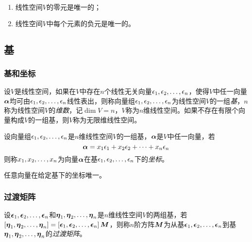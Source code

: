 \documentclass{ctexart}
\begin{document}
\begin{property}
    \begin{enumerate}
        \item 线性空间\(V\)的零元是唯一的；
        \item 线性空间\(V\)中每个元素的负元是唯一的。
    \end{enumerate}
\end{property}

\subsection{基}

\subsubsection*{基和坐标}

\begin{definition}[基]
    设\(V\)是线性空间，如果在\(V\)中存在\(n\)个线性无关向量\(\enums{\epsilon}{n}\)，使得\(V\)中任一向量\(\vecal\)均可由\(\enums{\epsilon}{n}\)线性表出，则称向量组\(\enums{\epsilon}{n}\)为线性空间\(V\)的一组\emph{基}，\(n\)称为线性空间\(V\)的\emph{维数}，记\(\dim{V}=n\)，\(V\)称为\(n\)维线性空间。如果不存在有限个向量构成\(V\)的一组基，则\(V\)称为无限维线性空间。
\end{definition}

\begin{definition}[坐标]
    设向量组\(\enums{\epsilon}{n}\)是\(n\)维线性空间\(V\)的一组基，\(\vecal\)是\(V\)中任一向量，若
    \begin{equation*}
        \vecal=x_1\epsilon_1+x_2\epsilon_2+\cdots+x_n\epsilon_n
    \end{equation*}
    则称\(\enums{x}{n}\)为向量\(\vecal\)在基\(\enums{\epsilon}{n}\)下的\emph{坐标}。
\end{definition}

\begin{theorem}
    任意向量在给定基下的坐标唯一。
\end{theorem}

\subsubsection*{过渡矩阵}

\begin{definition}[过渡矩阵]
    设\(\enums{\veceps}{n}\)和\(\enums{\veceta}{n}\)是\(n\)维线性空间\(V\)的两组基，若\(\mat{\enums{\veceta}{n}}=\mat{\enums{\veceps}{n}}\matm\)，则称\(n\)阶方阵\(\matm\)为从基\(\enums{\veceps}{n}\)到基\(\enums{\veceta}{n}\)的\emph{过渡矩阵}。
\end{definition}
\end{document}
